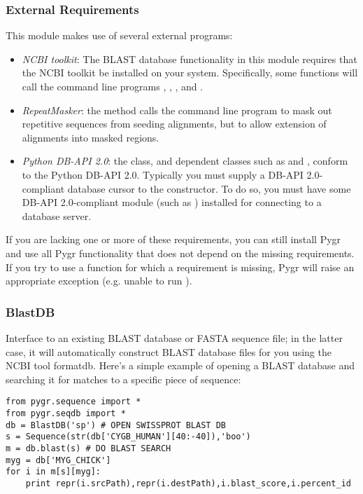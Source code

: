 \documentclass{howto}
\begin{document}
\subsubsection{External Requirements}
This module makes use of several external programs:
\begin{itemize}
\item
{\em NCBI toolkit}: The BLAST database functionality in this module 
requires that the NCBI toolkit
be installed on your system.  Specifically, some functions will call the command line
programs , , , and .

\item
{\em RepeatMasker}: the  method calls the command line
program  to mask out repetitive sequences from seeding alignments,
but to allow extension of alignments into masked regions.

\item
{\em Python DB-API 2.0}: the  class, and dependent classes such as 
 and , conform to the Python DB-API 2.0.
Typically you must supply a DB-API 2.0-compliant database cursor to the 
 constructor.  To do so, you must have some DB-API 2.0-compliant
module (such as ) installed for connecting to a database server.
\end{itemize} 

If you are lacking one or more of these requirements, you can still install Pygr
and use all Pygr functionality that does not depend on the missing requirements.
If you try to use a function for which a requirement is missing, Pygr will raise
an appropriate exception (e.g. unable to run ).

\subsubsection{BlastDB}
Interface to an existing BLAST database or FASTA sequence file; in the latter case, it will automatically construct BLAST database files for you using the NCBI tool formatdb. Here's a simple example of opening a BLAST database and searching it for matches to a specific piece of sequence:

\begin{verbatim}
from pygr.sequence import *
from pygr.seqdb import *
db = BlastDB('sp') # OPEN SWISSPROT BLAST DB
s = Sequence(str(db['CYGB_HUMAN'][40:-40]),'boo')
m = db.blast(s) # DO BLAST SEARCH
myg = db['MYG_CHICK']
for i in m[s][myg]:
    print repr(i.srcPath),repr(i.destPath),i.blast_score,i.percent_id
\end{verbatim}
\end{document}

